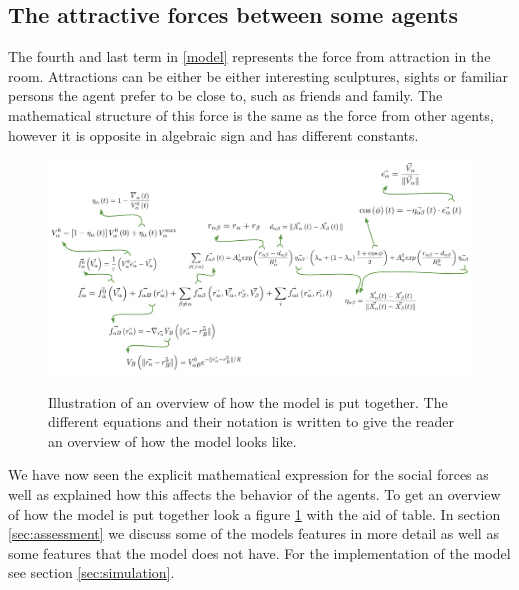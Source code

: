 
\subsection{The attractive forces between some agents}
The fourth and last term in \eqref{model} represents the force from attraction 
in the room. Attractions can be either be either interesting sculptures, 
sights or familiar persons the agent prefer to be close to, such as friends 
and family. The mathematical structure of this force is the same as the force 
from other agents, however it is opposite in algebraic sign and has different 
constants. 

\begin{figure}[hb] %
    \centering
    {\includegraphics[scale=0.35]{Figures/overview.pdf}} 
    \caption[Overview of the model]{Illustration of an overview of how the model is put together. The different equations and their notation is written to give the 
	     reader an overview of how the model looks like.}
    \label{overview}
\end{figure}

We have now seen the explicit mathematical expression for the social forces 
as well as explained how this affects the behavior of the agents. To get an 
overview of how the model is put together look a figure \ref{overview} with 
the aid of table. In section \ref{sec:assessment} 
we discuss some of the models features in more detail as well as some features 
that the model does not have. For the implementation of the model see section \ref{sec:simulation}.